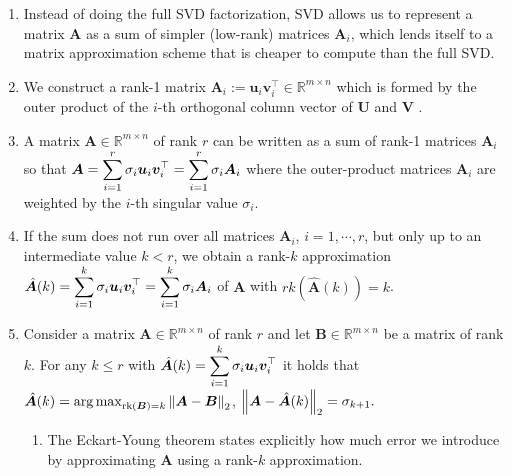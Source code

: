 \begin{enumerate}
    \item Instead of doing the full SVD factorization, SVD allows us to represent a matrix $\bm{A}$ as a sum of simpler (low-rank) matrices $\bm{A}_i$, which lends itself to a matrix approximation scheme that is cheaper to compute than the full SVD.
    \hfill \cite{mfml/book/mml/Deisenroth-Faisal-Ong}

    \item We construct a rank-1 matrix 
    $
        \bm{A}_i
        := \bm{u}_i \bm{v}_i^\top 
        \in \mathbb{R}^{m\times n}
    $
    which is formed by the outer product of the $i$-th orthogonal column vector of $\bm{U}$ and $\bm{V}$ .
    \hfill \cite{mfml/book/mml/Deisenroth-Faisal-Ong}

    \item A matrix $\bm{A} \in \mathbb{R}^{m\times n}$ of rank $r$ can be written as a sum of rank-1 matrices $\bm{A}_i$ so that 
    $
        \bm{A} 
        = \displaystyle\sum_{i=1}^r \sigma_i \bm{u}_i \bm{v}_i^\top
        = \displaystyle\sum_{i=1}^r \sigma_i \bm{A}_i
    $
    where the outer-product matrices $\bm{A}_i$ are weighted by the $i$-th singular value $\sigma_i$. 
    \hfill \cite{mfml/book/mml/Deisenroth-Faisal-Ong}

    \item If the sum does not run over all matrices $\bm{A}_i$, $i = 1, \cdots , r$, but only up to an intermediate value $k < r$, we obtain a rank-$k$ approximation
    $
        \hat{\bm{A}}(k) 
        = \displaystyle\sum_{i=1}^k \sigma_i \bm{u}_i \bm{v}_i^\top
        = \displaystyle\sum_{i=1}^k \sigma_i \bm{A}_i
    $
    of $\bm{A}$ with $rk(\hat{\bm{A}}(k)) = k$. 
    \hfill \cite{mfml/book/mml/Deisenroth-Faisal-Ong}

    \item \begin{theorem}
        Consider a matrix $\bm{A} \in \mathbb{R}^{m\times n}$ of rank $r$ and let $\bm{B} \in \mathbb{R}^{m\times n}$ be a matrix of rank $k$. 
        For any $k \leq r$ with $\hat{\bm{A}}(k) = \displaystyle\sum^k_{i=1} \sigma_i \bm{u}_i \bm{v}_i^\top$ it holds that
        ${
            \displaystyle
            \hat{\bm{A}}(k)
            = {\arg\max}_{\text{rk}(\bm{B})=k} \left\| \bm{A} - \bm{B} \right\|_2
        }$,
        \hspace{0.5cm}
        ${
            \displaystyle
            \left\| \bm{A} - \hat{\bm{A}}(k) \right\|_2 = \sigma_{k+1}.
        }$
        \hfill \cite{mfml/book/mml/Deisenroth-Faisal-Ong}
    \end{theorem}
    \begin{enumerate}
        \item The Eckart-Young theorem states explicitly how much error we introduce by approximating $\bm{A}$ using a rank-$k$ approximation.
        \hfill \cite{mfml/book/mml/Deisenroth-Faisal-Ong}


\end{enumerate}
\end{enumerate}
